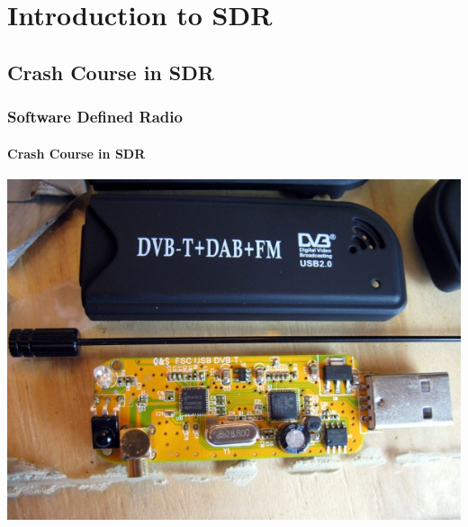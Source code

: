\documentclass[aspectratio=169]{beamer}
\begin{document}
\section{Introduction to SDR}
\subsection{Crash Course in SDR}
\begin{frame}
  \subsectionpage{}
\end{frame}

\begin{frame}[fragile]
    \frametitle{Software Defined Radio}
    \framesubtitle{Crash Course in SDR}
    \begin{center}
        \includegraphics[width=0.75\paperwidth,height=0.75\paperheight,keepaspectratio]{images/rtlsdr.jpg}
    \end{center}
\end{frame}
\end{document}
